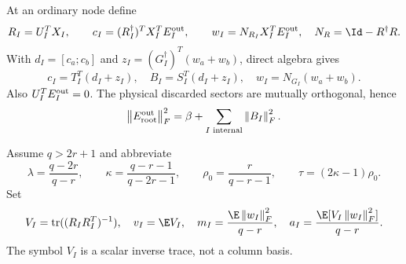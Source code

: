 \documentclass[11pt,oneside,openany,a4paper]{book}
\numberwithin{equation}{chapter}
\theoremstyle{definition}
\theoremstyle{remark}
\newcommand{\F}[1]{\left\lVert#1\right\rVert_F}
\DeclareMathOperator{\tr}{tr}\DeclareMathOperator{\rank}{rank}
\begin{document}
At an ordinary node define
\[
 R_I=U_I^TX_I,\qquad
 c_I=(R_I^\dagger)^TX_I^TE_I^{\rm out},\qquad
 w_I=N_{R_I}X_I^TE_I^{\rm out},
 \quad N_R=\Id-R^\dagger R.
\]
With $d_I=[c_a;c_b]$ and $z_I=(G_I^\dagger)^T(w_a+w_b)$, direct algebra gives
\begin{equation}\label{budget:eq:registers}
 \boxed{c_I=T_I^T(d_I+z_I),\quad B_I=S_I^T(d_I+z_I),
 \quad w_I=N_{G_I}(w_a+w_b).}
\end{equation}
Also $U_I^TE_I^{\rm out}=0$. The physical discarded sectors are mutually orthogonal, hence
\begin{equation}\label{budget:eq:physicalsum}
 \F{E_{\rm root}^{\rm out}}^2=\beta+\sum_{I\text{ internal}}\F{B_I}^2.
\end{equation}

Assume $q>2r+1$ and abbreviate
\begin{equation}\label{budget:eq:constants}
 \lambda=\frac{q-2r}{q-r},\qquad
 \kappa=\frac{q-r-1}{q-2r-1},\qquad
 \rho_0=\frac r{q-r-1},\qquad \tau=(2\kappa-1)\rho_0.
\end{equation}
Set
\begin{equation}\label{budget:eq:moments}
 V_I=\tr((R_IR_I^T)^{-1}),\quad v_I=\E V_I,\quad
 m_I=\frac{\E\F{w_I}^2}{q-r},\quad
 a_I=\frac{\E[V_I\F{w_I}^2]}{q-r}.
\end{equation}
The symbol $V_I$ is a scalar inverse trace, not a column basis.
\end{document}
